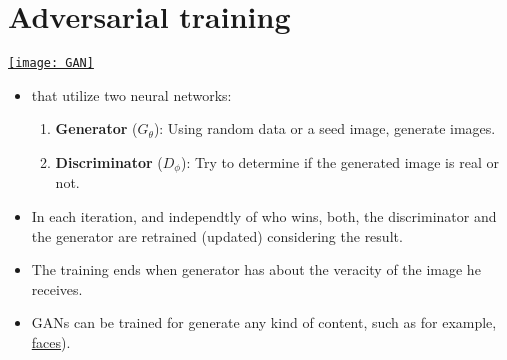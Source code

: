 \section*{Adversarial training}
\begin{center}
  \href{https://semiengineering.com/knowledge_centers/artificial-intelligence/neural-networks/generative-adversarial-network-gan/}{\texttt{[image: GAN]}}
\end{center}
\begin{itemize}
\item {} that
  utilize two neural networks:
  \begin{enumerate}
  \item \textbf{Generator} ($G_\theta$): Using random data or a seed image,
    generate  images.
  \item \textbf{Discriminator} ($D_\phi$): Try to determine if the generated
    image is real or not.
  \end{enumerate}
\item In each iteration, and independtly of who wins, both, the
  discriminator and the generator are retrained (updated) considering
  the result.
\item The training ends when generator has   about the veracity of the image
  he receives.
\item \glspl{GAN} can be trained for generate any kind of content,
  such as for example,
  \href{https://thispersondoesnotexist.com/}{faces}).
\end{itemize}

